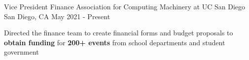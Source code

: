 

\begin{cventries}

\cvtwoentry
{Vice President Finance}
{Association for Computing Machinery at UC San Diego}
{San Diego, CA}
{May 2021 - Present}
{
\begin{cvitems}
  \item Directed the finance team to create financial forms and budget proposals to \textbf{obtain funding} for \textbf{200+ events} from school departments and student government

\end{cvitems}}
\end{cventries}
